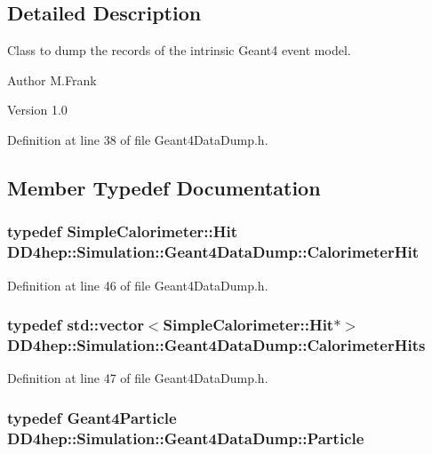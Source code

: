 \subsection{Detailed Description}
Class to dump the records of the intrinsic Geant4 event model. \begin{DoxyAuthor}{Author}
M.Frank 
\end{DoxyAuthor}
\begin{DoxyVersion}{Version}
1.0 
\end{DoxyVersion}


Definition at line 38 of file Geant4DataDump.h.

\subsection{Member Typedef Documentation}
\hypertarget{class_d_d4hep_1_1_simulation_1_1_geant4_data_dump_abbb746f00c083cdb09c3e0331cb920be}{
\subsubsection[{CalorimeterHit}]{\setlength{\rightskip}{0pt plus 5cm}typedef {\bf SimpleCalorimeter::Hit} {\bf DD4hep::Simulation::Geant4DataDump::CalorimeterHit}}}
\label{class_d_d4hep_1_1_simulation_1_1_geant4_data_dump_abbb746f00c083cdb09c3e0331cb920be}


Definition at line 46 of file Geant4DataDump.h.\hypertarget{class_d_d4hep_1_1_simulation_1_1_geant4_data_dump_a405c85a9a72c4f1dc0164d4a61d98f75}{
\subsubsection[{CalorimeterHits}]{\setlength{\rightskip}{0pt plus 5cm}typedef std::vector$<${\bf SimpleCalorimeter::Hit}$\ast$$>$ {\bf DD4hep::Simulation::Geant4DataDump::CalorimeterHits}}}
\label{class_d_d4hep_1_1_simulation_1_1_geant4_data_dump_a405c85a9a72c4f1dc0164d4a61d98f75}


Definition at line 47 of file Geant4DataDump.h.\hypertarget{class_d_d4hep_1_1_simulation_1_1_geant4_data_dump_a94c26fac6b79beaaed2c75c680b3f374}{
\subsubsection[{Particle}]{\setlength{\rightskip}{0pt plus 5cm}typedef {\bf Geant4Particle} {\bf DD4hep::Simulation::Geant4DataDump::Particle}}}
\label{class_d_d4hep_1_1_simulation_1_1_geant4_data_dump_a94c26fac6b79beaaed2c75c680b3f374}


